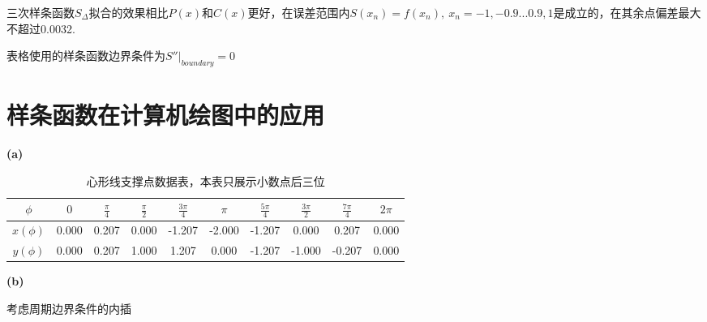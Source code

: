 \documentclass[UTF8]{ctexart}
\begin{document}
三次样条函数$S_\Delta$拟合的效果相比$P(x)$和$C(x)$更好，在误差范围内$S(x_n)=f(x_n),\ x_n=-1,-0.9...0.9,1$是成立的，在其余点偏差最大不超过0.0032.

表格使用的样条函数边界条件为$S''|_{boundary}=0$

\section{样条函数在计算机绘图中的应用}

\noindent\textbf{(a)}

\begin{table}[H]
    \centering
    \begin{tabular}{|c|ccccccccc|}
        \hline
        $\phi$ & $0$ & $\frac{\pi}{4}$ & $\frac{\pi}{2}$ & $\frac{3\pi}{4}$ & $\pi$ & $\frac{5\pi}{4}$ & $\frac{3\pi}{2}$ & $\frac{7\pi}{4}$ & $2\pi$ \\
        \hline
        $x(\phi)$ & 0.000 & 0.207 & 0.000 & -1.207 & -2.000 & -1.207 & 0.000 & 0.207 & 0.000\\
        $y(\phi)$ & 0.000 & 0.207 & 1.000 & 1.207 & 0.000 & -1.207 & -1.000 & -0.207 & 0.000\\
        \hline
    \end{tabular}
    \caption{心形线支撑点数据表，本表只展示小数点后三位}
\end{table}

\noindent\textbf{(b)}

考虑周期边界条件的内插
\end{document}
